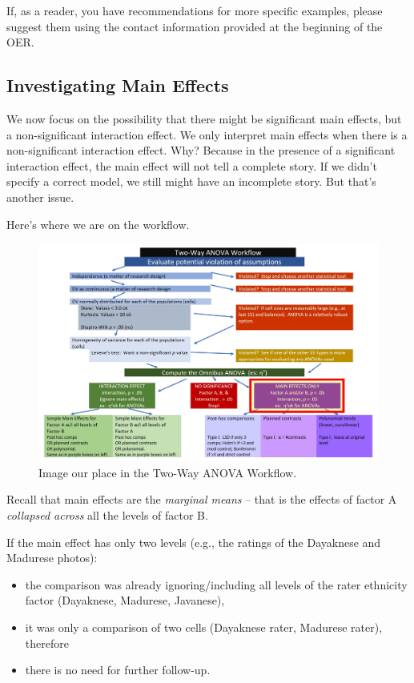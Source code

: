 \documentclass[
  11pt,
]{book}
\providecommand{\tightlist}{%
  \setlength{\itemsep}{0pt}\setlength{\parskip}{0pt}}
\begin{document}
If, as a reader, you have recommendations for more specific examples, please suggest them using the contact information provided at the beginning of the OER.

\hypertarget{investigating-main-effects}{%
\subsection{Investigating Main Effects}\label{investigating-main-effects}}

We now focus on the possibility that there might be significant main effects, but a non-significant interaction effect. We only interpret main effects when there is a non-significant interaction effect. Why? Because in the presence of a significant interaction effect, the main effect will not tell a complete story. If we didn't specify a correct model, we still might have an incomplete story. But that's another issue.

Here's where we are on the workflow.

\begin{figure}
\centering
\includegraphics{images/factorial/WayWrkFlw_Main.jpg}
\caption{Image our place in the Two-Way ANOVA Workflow.}
\end{figure}

Recall that main effects are the \emph{marginal means} -- that is the effects of factor A \emph{collapsed across} all the levels of factor B.

If the main effect has only two levels (e.g., the ratings of the Dayaknese and Madurese photos):

\begin{itemize}
\tightlist
\item
  the comparison was already ignoring/including all levels of the rater ethnicity factor (Dayaknese, Madurese, Javanese),
\item
  it was only a comparison of two cells (Dayaknese rater, Madurese rater), therefore
\item
  there is no need for further follow-up.
\end{itemize}
\end{document}
